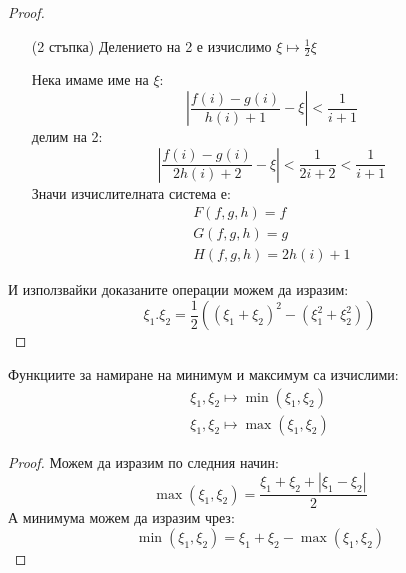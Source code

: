 \begin{proof}
\begin{itemize}
        \item[(2 стъпка)] Делението на 2 е изчислимо $\xi \mapsto \frac{1}{2}\xi$

        Нека имаме име на $\xi$:
        \begin{equation}
            \left|\frac{f(i) - g(i)}{h(i) + 1} - \xi\right| < \frac{1}{i+1}
        \end{equation}
        делим на 2:
        \begin{equation}
            \left|\frac{f(i) - g(i)}{2h(i) + 2} - \xi\right| < \frac{1}{2i+2} < \frac{1}{i+1}
        \end{equation}
        Значи изчислителната система е:
        \begin{equation}
            \begin{split}
                F(f, g, h) = f \\
                G(f, g, h) = g \\
                H(f, g, h) = 2h(i) + 1
            \end{split}
        \end{equation}
    \end{itemize}

    И използвайки доказаните операции можем да изразим:
    \begin{equation}
        \xi_1.\xi_2 = \frac{1}{2}\left((\xi_1 + \xi_2)^2 - (\xi_1^2 + \xi_2^2)\right)
    \end{equation}
\end{proof}

\begin{corollary}
    Функциите за намиране на минимум и максимум са изчислими:
    \begin{equation}
        \begin{split}
            \xi_1, \xi_2 \mapsto \min(\xi_1, \xi_2) \\
            \xi_1, \xi_2 \mapsto \max(\xi_1, \xi_2)
        \end{split}
    \end{equation}
\end{corollary}
\begin{proof}
    Можем да изразим по следния начин:
    \begin{equation}
        \max(\xi_1, \xi_2) = \frac{\xi_1 + \xi_2 + |\xi_1 - \xi_2|}{2}
    \end{equation}
    А минимума можем да изразим чрез:
    \begin{equation}
        \min(\xi_1, \xi_2) = \xi_1 + \xi_2 - \max(\xi_1, \xi_2)
    \end{equation}
\end{proof}